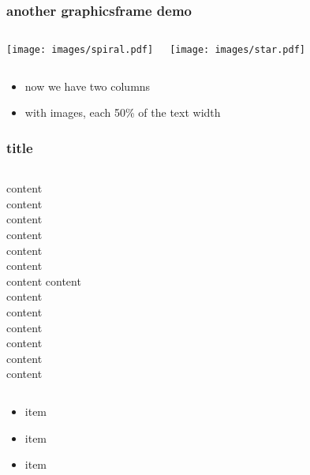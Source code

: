 \documentclass[8pt]{beamer}
\begin{document}
% 
% 
% 
%   
% 
\begin{frame}
\frametitle{another graphicsframe demo}


\begin{columns}
    \begin{center}\texttt{[image: images/spiral.pdf]}\end{center}
    \begin{center}\texttt{[image: images/star.pdf]}\end{center}
\end{columns}

\begin{itemize}
\item
now we have two columns
\item
with images, each 50\% of the text width
\end{itemize}
\end{frame}







% 
% 
% 
% 
% 
\begin{frame}
\frametitle{title}

\begin{columns}
    content\\
    content\\
    content\\
    content\\
    content\\
    content\\
    content
    content\\
    content\\
    content\\
    content\\
    content\\
    content\\
    content
\end{columns}

\begin{itemize}
\item
item
\item
item
\item
item
\end{itemize}
\end{frame}
\end{document}
